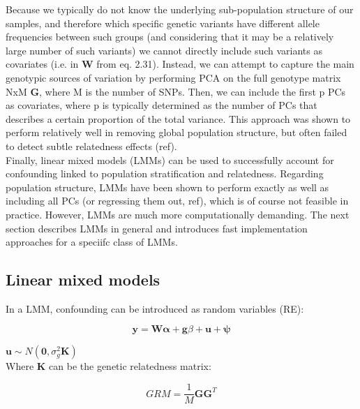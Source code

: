 Because we typically do not know the underlying sub-population structure of our samples, and therefore which specific genetic variants have different allele frequencies between such groups (and considering that it may be a relatively large number of such variants) we cannot directly include such variants as covariates (i.e. in $\mathbf{W}$ from eq. 2.31).
Instead, we can attempt to capture the main genotypic sources of variation by performing PCA on the full genotype matrix NxM $\mathbf{G}$, where M is the number of SNPs.
Then, we can include the first p PCs as covariates, where p is typically determined as the number of PCs that describes a certain proportion of the total variance.
This approach was shown to perform relatively well in removing global population structure, but often failed to detect subtle relatedness effects (ref).\\



Finally, linear mixed models (LMMs) can be used to successfully account for confounding linked to population stratification and relatedness.
Regarding population structure, LMMs have been shown to perform exactly as well as  including all PCs (or regressing them out, ref), which is of course not feasible in practice. 
However, LMMs are much more computationally demanding.
The next section describes LMMs in general and introduces fast implementation approaches for a speciifc class of LMMs.

\subsection{Linear mixed models}

In a LMM, confounding can be introduced as random variables (RE):

\begin{equation}\label{eq22:Linear_mixed_model}
 \mathbf{y} =  \mathbf{W}\boldsymbol{\alpha} + \mathbf{g}\beta + \mathbf{u} + \boldsymbol{\psi} 
\end{equation}

$\mathbf{u} \sim N(\mathbf{0}, \sigma_g^2\mathbf{K})$\\

Where $\mathbf{K}$ can be the genetic relatedness matrix:

\begin{equation}
    GRM = \frac{1}{M}\mathbf{G}\mathbf{G}^T
\end{equation}

